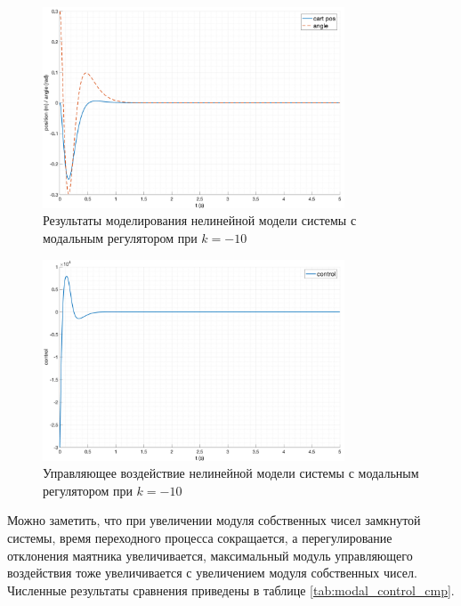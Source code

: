 \begin{figure}[ht!]
    \centering
    \includegraphics[width=0.8\textwidth]{media/plots/modal_controllers/modal_control_out_4.png}
    \caption{Результаты моделирования нелинейной модели системы с модальным регулятором при $k = -10$}
    \label{fig:modal_controlers_4_out}
\end{figure}
\begin{figure}[ht!]
    \centering
    \includegraphics[width=0.8\textwidth]{media/plots/modal_controllers/modal_control_u_4.png}
    \caption{Управляющее воздействие нелинейной модели системы с модальным регулятором при $k = -10$}
    \label{fig:modal_controlers_4_u}
\end{figure}
Можно заметить, что при увеличении модуля собственных чисел замкнутой системы, время переходного процесса
сокращается, а перегулирование отклонения маятника увеличивается, максимальный модуль управляющего воздействия 
тоже увеличивается с увеличением модуля собственных чисел. Численные результаты сравнения приведены в таблице \ref{tab:modal_control_cmp}. 

